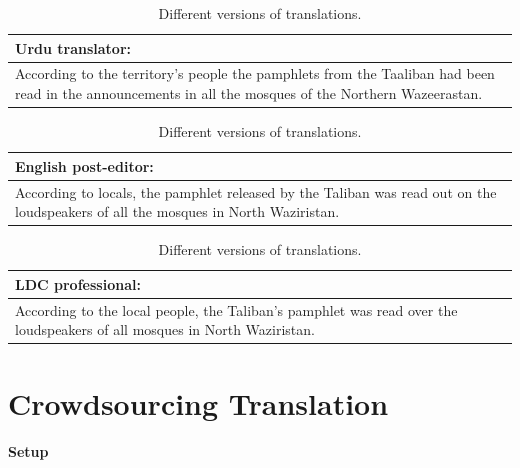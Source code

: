 \documentclass[11pt]{article}
\begin{document}
\begin{table}[t]
\centering
\begin{tabular}{|l|} \hline
Urdu translator:\\ \hline
 \begin{minipage}[position]{0.45\textwidth}
  \vspace{1mm}\small{According to the territory's people the pamphlets from the Taaliban had been read in the announcements in all the mosques of the Northern Wazeerastan.}\vspace{1mm}
 \end{minipage}
\\ \hline \end{tabular}
\begin{tabular}{|l|} \hline
English post-editor:\\ \hline
 \begin{minipage}[position]{0.45\textwidth}
    \vspace{1mm}\small{According to locals, the pamphlet released by the Taliban was read out on the loudspeakers of all the mosques in North Waziristan.}\vspace{1mm}
 \end{minipage}
\\ \hline \end{tabular}
\begin{tabular}{|l|} \hline
LDC professional:\\ \hline
 \begin{minipage}[position]{0.45\textwidth}
      \vspace{1mm}\small{According to the local people, the Taliban's pamphlet was read over the loudspeakers of all mosques in North Waziristan.} \vspace{1mm}
 \end{minipage}
\\ \hline \end{tabular}
\caption{Different versions of translations.}
\label{translations}
\end{table}


\nocite{*}


\section{Crowdsourcing Translation}


\paragraph{Setup}
\end{document}
